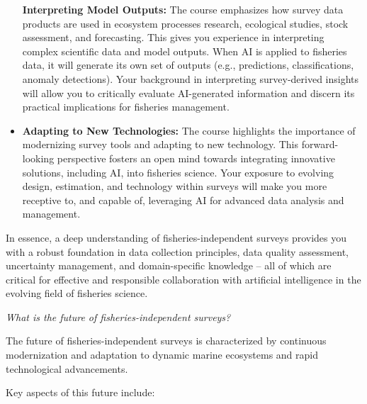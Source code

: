\documentclass[
  letterpaper,
  oneside,
  open=any]{scrbook}
\begin{document}
\begin{itemize}
  \textbf{Interpreting Model Outputs:} The course emphasizes how survey
  data products are used in ecosystem processes research, ecological
  studies, stock assessment, and forecasting. This gives you experience
  in interpreting complex scientific data and model outputs. When AI is
  applied to fisheries data, it will generate its own set of outputs
  (e.g., predictions, classifications, anomaly detections). Your
  background in interpreting survey-derived insights will allow you to
  critically evaluate AI-generated information and discern its practical
  implications for fisheries management.
\item
  \textbf{Adapting to New Technologies:} The course highlights the
  importance of modernizing survey tools and adapting to new technology.
  This forward-looking perspective fosters an open mind towards
  integrating innovative solutions, including AI, into fisheries
  science. Your exposure to evolving design, estimation, and technology
  within surveys will make you more receptive to, and capable of,
  leveraging AI for advanced data analysis and management.
\end{itemize}

In essence, a deep understanding of fisheries-independent surveys
provides you with a robust foundation in data collection principles,
data quality assessment, uncertainty management, and domain-specific
knowledge -- all of which are critical for effective and responsible
collaboration with artificial intelligence in the evolving field of
fisheries science.

\emph{What is the future of fisheries-independent surveys?}

The future of fisheries-independent surveys is characterized by
continuous modernization and adaptation to dynamic marine ecosystems and
rapid technological advancements.

Key aspects of this future include:
\end{document}
